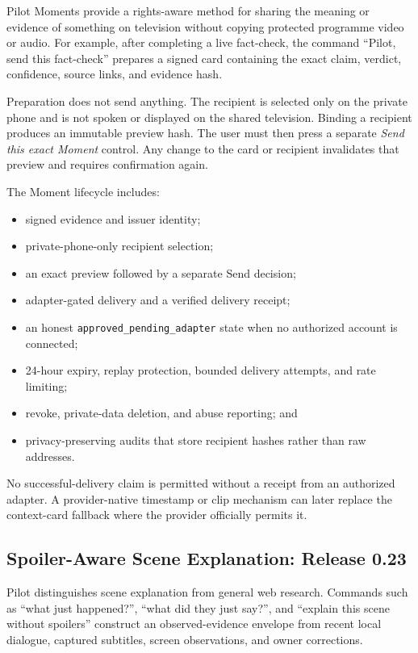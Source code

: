 Pilot Moments provide a rights-aware method for sharing the meaning or evidence
of something on television without copying protected programme video or audio.
For example, after completing a live fact-check, the command
``Pilot, send this fact-check'' prepares a signed card containing the exact
claim, verdict, confidence, source links, and evidence hash.

Preparation does not send anything.  The recipient is selected only on the
private phone and is not spoken or displayed on the shared television.  Binding
a recipient produces an immutable preview hash.  The user must then press a
separate \emph{Send this exact Moment} control.  Any change to the card or
recipient invalidates that preview and requires confirmation again.

The Moment lifecycle includes:

\begin{itemize}
    \item signed evidence and issuer identity;
    \item private-phone-only recipient selection;
    \item an exact preview followed by a separate Send decision;
    \item adapter-gated delivery and a verified delivery receipt;
    \item an honest \texttt{approved\_pending\_adapter} state when no authorized
    account is connected;
    \item 24-hour expiry, replay protection, bounded delivery attempts, and rate
    limiting;
    \item revoke, private-data deletion, and abuse reporting; and
    \item privacy-preserving audits that store recipient hashes rather than raw
    addresses.
\end{itemize}

No successful-delivery claim is permitted without a receipt from an authorized
adapter.  A provider-native timestamp or clip mechanism can later replace the
context-card fallback where the provider officially permits it.

\subsection{Spoiler-Aware Scene Explanation: Release 0.23}

Pilot distinguishes scene explanation from general web research.  Commands such
as ``what just happened?'', ``what did they just say?'', and ``explain this scene
without spoilers'' construct an observed-evidence envelope from recent local
dialogue, captured subtitles, screen observations, and owner corrections.

